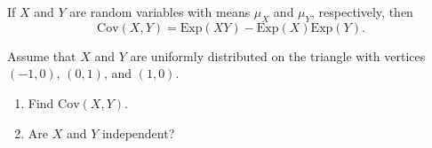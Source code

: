 \begin{theorem}
If $X$ and $Y$ are random variables with means $\mu_X$ and $\mu_Y$, respectively, then
    \[
        \mathrm{Cov} (X, Y) = \mathrm{Exp} (XY) - \mathrm{Exp} (X) \mathrm{Exp} (Y) .
    \]
\end{theorem}

\begin{example}
Assume that $X$ and $Y$ are uniformly distributed on the triangle with vertices $(-1,0)$, $(0,1 )$, and $(1, 0)$. 
    \begin{enumerate}[label=\alph*)]
        \item Find $\mathrm{Cov} (X, Y)$.
        \item Are $X$ and $Y$ independent?
    \end{enumerate}
\end{example}


